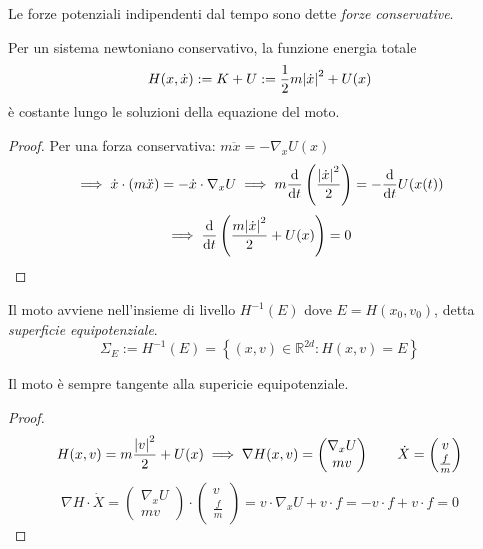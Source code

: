 Le forze potenziali indipendenti dal tempo sono dette \textit{forze conservative}.
\begin{theorem}
    Per un sistema newtoniano conservativo, la funzione energia totale
    \begin{equation}
        H(x,\dot{x}):= K +U := \frac{1}{2}m\abs{\dot{x}}^2+U(x)
    \end{equation}
    è costante lungo le soluzioni della equazione del moto.
\end{theorem}
\begin{proof}
    Per una forza conservativa: $m\ddot{x}= -\nabla_xU(x)$
    \begin{equation*}
        \implies \dot{x}\cdot (m\ddot{x})= -\dot{x} \cdot\nabla_xU \implies m\dv{}{t}\left( \frac{\abs{\dot{x}}^2}{2} \right)= -\dv{}{t}U(x(t))
    \end{equation*}
    \begin{equation}
        \implies \dv{}{t}\left( \frac{m\abs{\dot{x}}^2}{2} +U(x) \right) = 0
    \end{equation}
\end{proof}

Il moto avviene nell'insieme di livello $H^{-1}(E)$ dove $E = H(x_0,v_0)$, detta \textit{superficie equipotenziale}.
\begin{equation}
    \Sigma_E:= H^{-1}(E)=\left\{ (x,v) \in \mathbb{R}^{2d}:H(x,v)=E  \right\} 
\end{equation}

\begin{proposition}
    Il moto è sempre tangente alla supericie equipotenziale.
\end{proposition}
\begin{proof}
    \begin{equation*}
        H(x,v)= m\frac{\abs{v}^2}{2}+U(x) \implies 
        \nabla H(x,v)= 
        \begin{pmatrix}
            \nabla_xU\\mv 
        \end{pmatrix}
        \qquad \dot{X}= 
        \begin{pmatrix}
            v\\\frac{f}{m}
        \end{pmatrix}
    \end{equation*}
    \begin{equation*}
        \nabla H \cdot \dot{X}=  
        \begin{pmatrix}
            \nabla_xU\\mv 
        \end{pmatrix} \cdot
        \begin{pmatrix}
            v\\\frac{f}{m}
        \end{pmatrix}
        = v\cdot\nabla_xU +v\cdot f = -v \cdot f +v\cdot f = 0 
    \end{equation*}
\end{proof}

